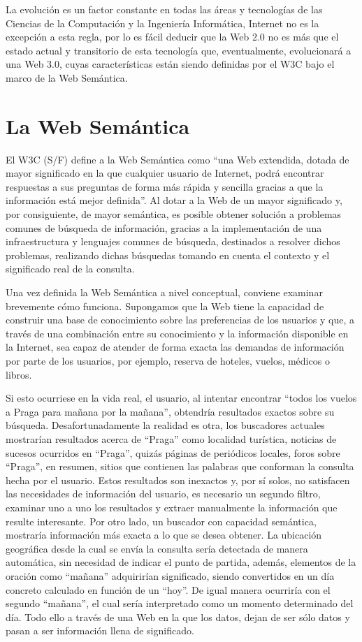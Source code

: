 La evolución es un factor constante en todas las áreas y tecnologías de las Ciencias de la Computación y la Ingeniería Informática, Internet no es la excepción a esta regla, por lo es fácil deducir que la Web 2.0 no es más que el estado actual y transitorio de esta tecnología que, eventualmente, evolucionará a una Web 3.0, cuyas características están siendo definidas por el W3C bajo el marco de la Web Semántica.

\section{La Web Semántica}

El W3C (S/F) define a la Web Semántica como ``una Web extendida, dotada de mayor significado en la que cualquier usuario de Internet, podrá encontrar respuestas a sus preguntas de forma más rápida y sencilla gracias a que la información está mejor definida''. Al dotar a la Web de un mayor significado y, por consiguiente, de mayor semántica, es posible obtener solución a problemas comunes de búsqueda de información, gracias a la implementación de una infraestructura y lenguajes comunes de búsqueda, destinados a resolver dichos problemas, realizando dichas búsquedas tomando en cuenta el contexto y el significado real de la consulta.

Una vez definida la Web Semántica a nivel conceptual, conviene examinar brevemente cómo funciona. Supongamos que la Web tiene la capacidad de construir una base de conocimiento sobre las preferencias de los usuarios y que, a través de una combinación entre su conocimiento y la información disponible en la Internet, sea capaz de atender de forma exacta las demandas de información por parte de los usuarios, por ejemplo, reserva de hoteles, vuelos, médicos o libros.

Si esto ocurriese en la vida real, el usuario, al intentar encontrar ``todos los vuelos a Praga para mañana por la mañana'', obtendría resultados exactos sobre su búsqueda. Desafortunadamente la realidad es otra, los buscadores actuales mostrarían resultados acerca de ``Praga'' como localidad turística, noticias de sucesos ocurridos en ``Praga'', quizás páginas de periódicos locales, foros sobre ``Praga'', en resumen, sitios que contienen las palabras que conforman la consulta hecha por el usuario. Estos resultados son inexactos y, por sí solos, no satisfacen las necesidades de información del usuario, es necesario un segundo filtro, examinar uno a uno los resultados y extraer manualmente la información que resulte interesante. Por otro lado, un buscador con capacidad semántica, mostraría información más exacta a lo que se desea obtener. La ubicación geográfica desde la cual se envía la consulta sería detectada de manera automática, sin necesidad de indicar el punto de partida, además, elementos de la oración como ``mañana'' adquirirían significado, siendo convertidos en un día concreto calculado en función de un ``hoy''. De igual manera ocurriría con el segundo ``mañana'', el cual sería interpretado como un momento determinado del día. Todo ello a través de una Web en la que los datos, dejan de ser sólo datos y pasan a ser información llena de significado.


